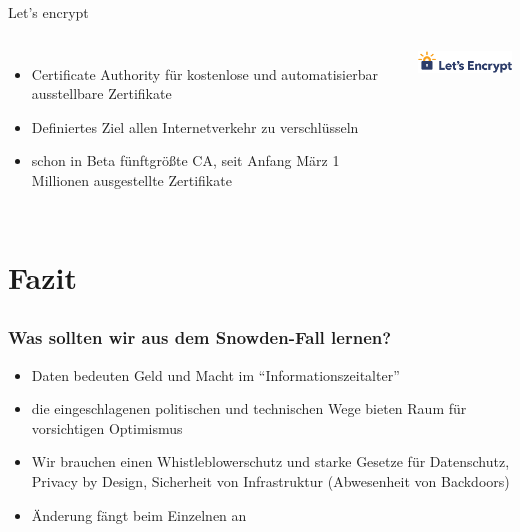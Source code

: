 \documentclass[12pt, xcolor={svgnames,table}]{beamer}
\begin{document}
\begin{frame}{Let's encrypt}
  \begin{columns}
    \column{5.5cm}
    \footnotesize

    \begin{itemize}
      \item Certificate Authority für kostenlose und automatisierbar ausstellbare Zertifikate
      \item Definiertes Ziel allen Internetverkehr zu verschlüsseln
      \item schon in Beta fünftgrößte CA, seit Anfang März 1 Millionen ausgestellte Zertifikate
    \end{itemize}

    \column{5cm}

    \begin{center}
      \includegraphics[width=3.5cm]{img/letsencrypt}
    \par\end{center}
  \end{columns}
\end{frame}

\section{Fazit}
\subsection{}

\begin{frame}
    \frametitle{Was sollten wir aus dem Snowden-Fall lernen?}
    \footnotesize
    \begin{itemize}
      \item Daten bedeuten Geld und Macht im ``Informationszeitalter''
      \item die eingeschlagenen politischen und technischen Wege bieten Raum für vorsichtigen Optimismus
      \item Wir brauchen einen Whistleblowerschutz und starke Gesetze für Datenschutz, Privacy by Design, Sicherheit von Infrastruktur (Abwesenheit von Backdoors)
      \item Änderung fängt beim Einzelnen an
    \end{itemize}
\end{frame}
\end{document}
